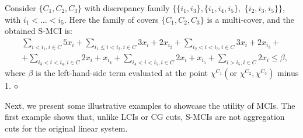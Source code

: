 \begin{example}
\label{exam: closed_2}
Consider $\{C_1, C_2, C_3\}$ with discrepancy family $\{\{i_1, i_3\},\{i_1, i_4, i_5\},$ $\{i_2, i_3, i_5\}\}$, with $i_1 < \ldots < i_{5}$. Here the family of covers $\{C_1, C_2, C_3\}$ is a multi-cover, and the obtained S-MCI is:
{\small
\begin{equation}
\label{eq: CAI_3}
\begin{split}
& \sum_{i < i_1, i \in C}  5x_i + \sum_{i_1 \leq i < i_2, i \in C} 3x_i + 2 x_{i_2} +  \sum_{i_2 < i < i_3, i \in C} 3x_i + 2x_{i_3} + \\
& +  \sum_{i_3 < i < i_4, i \in C} 2x_i + x_{i_4} +  \sum_{i_4 < i < i_5, i \in C} 2x_i + x_{i_5} + \sum_{i > i_5, i \in C} 2x_i \leq \beta,
\end{split}
\end{equation}
}
where $\beta$ is the left-hand-side term evaluated at the point $\chi^{C_1} (\text{or } \chi^{C_2}, \chi^{C_3})$  minus 1. 
$\hfill\diamond$
\end{example}



Next, we present some illustrative examples to showcase the utility of MCIs. 
The first example shows that, unlike LCIs or CG cuts, S-MCIs are not
aggregation cuts for the original linear system.


